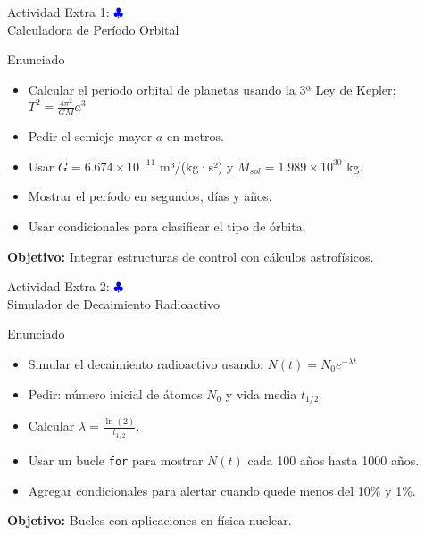 \documentclass[10pt]{beamer}
\begin{document}
\begin{frame}{Actividad Extra 1: \hfill \textcolor{blue}{$\clubsuit$} \\ Calculadora de Período Orbital}
  \begin{block}{Enunciado}
    \begin{itemize}
      \item Calcular el período orbital de planetas usando la 3ª Ley de Kepler: $T^2 = \frac{4\pi^2}{GM}a^3$
      \item Pedir el semieje mayor \(a\) en metros.
      \item Usar \(G = 6.674 \times 10^{-11}\) m³/(kg·s²) y \(M_{sol} = 1.989 \times 10^{30}\) kg.
      \item Mostrar el período en segundos, días y años.
      \item Usar condicionales para clasificar el tipo de órbita.
    \end{itemize}
  \end{block}
  \textbf{Objetivo:} Integrar estructuras de control con cálculos astrofísicos.
\end{frame}

\begin{frame}{Actividad Extra 2: \hfill \textcolor{blue}{$\clubsuit$} \\ Simulador de Decaimiento Radioactivo}
  \begin{block}{Enunciado}
    \begin{itemize}
      \item Simular el decaimiento radioactivo usando: $N(t) = N_0 e^{-\lambda t}$
      \item Pedir: número inicial de átomos $N_0$ y vida media $t_{1/2}$.
      \item Calcular $\lambda = \frac{\ln(2)}{t_{1/2}}$.
      \item Usar un bucle \texttt{for} para mostrar $N(t)$ cada 100 años hasta 1000 años.
      \item Agregar condicionales para alertar cuando quede menos del 10\% y 1\%.
    \end{itemize}
  \end{block}
  \textbf{Objetivo:} Bucles con aplicaciones en física nuclear.
\end{frame}
\end{document}
